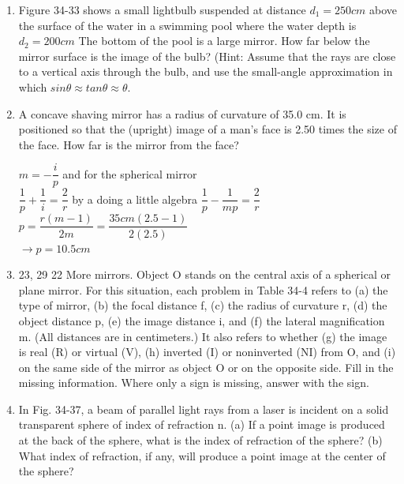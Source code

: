 \documentclass[fleqn]{article}
\begin{document}
  \begin{enumerate}
    \item Figure 34-33 shows a small lightbulb suspended at distance $d_1=250 cm$ above the surface of the water in a swimming pool where the water depth is $d_2=200 cm$ The bottom of the pool is a large mirror. How far below the mirror surface is the image of the bulb? (Hint: Assume that the rays are close to a vertical axis through the bulb, and use the small-angle approximation in which $sin\theta \approx tan \theta \approx \theta $.

    \item A concave shaving mirror has a radius of curvature of 35.0 cm. It is positioned so that the (upright) image of a man’s face is 2.50 times the size of the face. How far is the mirror from the face?

      \textcolor{hwColor}{
        $
          m=-\dfrac{i}{p}
        $ 
        and for the spherical mirror
        \\
        $
          \dfrac{1}{p}+\dfrac{1}{i}=\dfrac{2}{r}
        $ 
        by a doing a little algebra
        $
          \dfrac{1}{p}-\dfrac{1}{mp}=\dfrac{2}{r}
        $
        \\
        $
          p=\dfrac{r(m-1)}{2m}=\dfrac{35 cm(2.5-1)}{2(2.5)}
        $
        \\
        $
          \rightarrow p=10.5 cm
        $
      }

    \item 23, 29 22 More mirrors. Object O stands on the central axis of a spherical or plane mirror. For this situation, each problem in Table 34-4 refers to (a) the type of mirror, (b) the focal distance f, (c) the radius of curvature r, (d) the object distance p, (e) the image distance i, and (f) the lateral magnification m. (All distances are in centimeters.) It also refers to whether (g) the image is real (R) or virtual (V), (h) inverted (I) or noninverted (NI) from O, and (i) on the same side of the mirror as object O or on the opposite side. Fill in the missing information. Where only a sign is missing, answer with the sign.

    \item In Fig. 34-37, a beam of parallel light rays from a laser is incident on a solid transparent sphere of index of refraction n. (a) If a point image is produced at the back of the sphere, what is the index of refraction of the sphere? (b) What index of refraction, if any, will produce a point image at the center of the sphere?
    

\end{enumerate}
\end{document}
